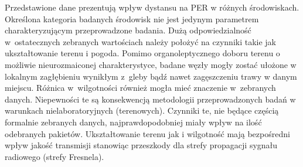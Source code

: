 
Przedstawione dane prezentują wpływ dystansu na PER w różnych środowiskach. Określona kategoria badanych środowisk nie jest jedynym
parametrem charakteryzującym przeprowadzone badania. Dużą odpowiedzialność w~ostatecznych zebranych wartościach należy położyć
na czynniki takie jak ukształtowanie terenu i pogoda. Pomimo organoleptycznego doboru terenu o możliwie nieurozmaiconej charakterystyce,
badane węzły mogły zostać ułożone w lokalnym zagłębieniu wynikłym z~gleby bądź nawet zagęszczeniu trawy w danym miejscu. Różnica
w~wilgotności również mogła mieć znaczenie w~zebranych danych. Niepewności te są konsekwencją metodologii przeprowadzonych
badań w warunkach nielaboratoryjnych (terenowych). Czynniki te, nie będące częścią formalnie zebranych danych, najprawdopodobniej
miały wpływ na ilość odebranych pakietów. Ukształtowanie terenu jak i wilgotność mają bezpośredni wpływ jakość transmisji stanowiąc
przeszkody dla strefy propagacji sygnału radiowego (strefy Fresnela).

